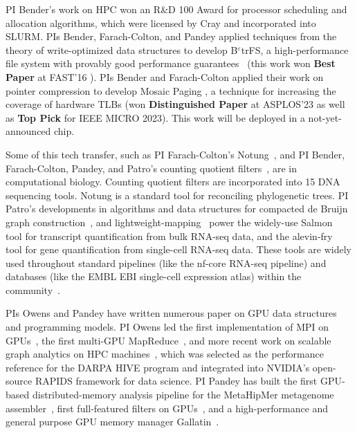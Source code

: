 PI Bender's work on HPC  won an R\&D 100 Award for processor scheduling and allocation algorithms, which were licensed
by Cray and incorporated into SLURM.
PIs Bender, Farach-Colton, and Pandey applied techniques from the theory of write-optimized data structures to develop B$^\varepsilon$trFS, a high-performance file system with provably good performance guarantees~\cite{JannenYuZh15a,JannenYuZh15b,login2,YuanZhJa16,login1,DBLP:conf/fast/0001CJMGBFJJPY20,DBLP:conf/hotstorage/ConwayKJBJJPF19,DBLP:journals/tos/ZhanJPCKFBYJJ18,DBLP:conf/fast/ZhanCJKBFJJPY18,DBLP:journals/tos/YuanZJPACDKWBFJ17,DBLP:journals/usenix-login/ConwayBJ0BJJKPY17,DBLP:conf/fast/ConwayBJJZYBJKP17} (this work won \textbf{Best Paper} at FAST'16 \cite{YuanZhJa16}). 
PIs Bender and Farach-Colton  applied their work on pointer compression to develop Mosaic Paging \cite{mosaicasplos, mosaicspaa}, a technique for increasing the coverage of hardware TLBs (won \textbf{Distinguished Paper} at ASPLOS'23 as well as \textbf{Top Pick} for IEEE MICRO 2023). This work will be deployed  in a not-yet-announced chip. 

Some of this tech transfer, such as PI Farach-Colton's 
Notung~\cite{ChenDuFa00}, and 
PI  Bender, Farach-Colton, Pandey, and Patro's counting quotient filters~\cite{PandeyBeJo17}, are  in computational biology. 
Counting quotient filters are incorporated into 15
DNA sequencing tools.
Notung is a standard tool for reconciling phylogenetic trees.
%
PI Patro's developments in algorithms and data structures for compacted de Bruijn graph construction~\cite{Khan2021,Khan2022}, and lightweight-mapping~\cite{Srivastava2016, Almodaresi2018Pufferfish, srivastava2020alignment, Almodaresi2021} power the widely-use Salmon~\cite{Patro2017Salmon} tool for transcript quantification from bulk RNA-seq data, and the alevin-fry~\cite{he2022alevin, He2023} tool for gene quantification from single-cell RNA-seq data. These tools are widely used throughout standard pipelines (like the nf-core RNA-seq pipeline) and databases (like the EMBL EBI single-cell expression atlas) within the community~\cite{Ewels2020,George2023}.


PIs Owens and Pandey have written numerous paper on GPU data structures and programming models.
PI Owens led the first implementation of MPI on GPUs~\cite{Stuart:2009:MPO:withouturl,Stuart:2011:EMT}, the first multi-GPU MapReduce~\cite{Stuart:2011:MMO}, and more recent work on scalable graph analytics on HPC machines~\cite{Pan:2018:SBS,Pan:2017:MGA,Chen:2022:SIP}, which was selected as the performance reference for the DARPA HIVE program and integrated into NVIDIA's open-source RAPIDS framework for data science. PI Pandey has built the first GPU-based distributed-memory \kmer analysis pipeline for the MetaHipMer metagenome assembler~\cite{nisa2021distributed, DBLP:conf/ppopp/McCoyHY023}, first full-featured filters on GPUs~\cite{McCoyHYP23a}, and a high-performance and general purpose GPU memory manager Gallatin~\cite{mccoy2024gallatin}.


